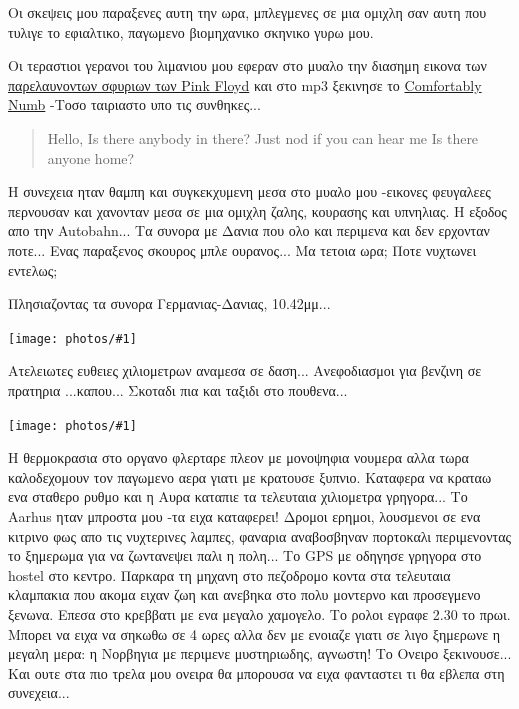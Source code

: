 \documentclass[11pt, letterpaper]{book}
\newcommand\photo[1]{\begin{center}\noindent\texttt{[image: photos/\#1]}\end{center}}
\begin{document}
Οι σκεψεις μου παραξενες αυτη την ωρα, μπλεγμενες σε μια ομιχλη σαν αυτη που τυλιγε το εφιαλτικο, παγωμενο βιομηχανικο σκηνικο γυρω μου.

Οι τεραστιοι γερανοι του λιμανιου μου εφεραν στο μυαλο την διασημη εικονα των \href{http://upload.wikimedia.org/wikipedia/en/0/03/Pinkfloydhammers.jpg}{παρελαυνοντων σφυριων των Pink Floyd} και στο mp3 ξεκινησε το \href{http://www.youtube.com/watch?v=jySUpMqmzd4}{Comfortably Numb} -Tοσο ταιριαστο υπο τις συνθηκες...

\begin{verse}
Hello,
Is there anybody in there?
Just nod if you can hear me
Is there anyone home?
\end{verse}

Η συνεχεια ηταν θαμπη και συγκεκχυμενη μεσα στο μυαλο μου -εικονες φευγαλεες περνουσαν και χανονταν μεσα σε μια ομιχλη ζαλης, κουρασης και υπνηλιας. Η εξοδος απο την Autobahn... Τα συνορα με Δανια που ολο και περιμενα και δεν ερχονταν ποτε... Ενας παραξενος σκουρος μπλε ουρανος... Μα τετοια ωρα; Ποτε νυχτωνει εντελως; 

Πλησιαζοντας τα συνορα Γερμανιας-Δανιας, 10.42μμ...

\photo{134.jpg}

Ατελειωτες ευθειες χιλιομετρων αναμεσα σε δαση... Ανεφοδιασμοι για βενζινη σε πρατηρια ...καπου... Σκοταδι πια και ταξιδι στο πουθενα...

\photo{135.jpg}

Η θερμοκρασια στο οργανο φλερταρε πλεον με μονοψηφια νουμερα αλλα τωρα καλοδεχομουν τον παγωμενο αερα γιατι με κρατουσε ξυπνιο. Καταφερα να κραταω ενα σταθερο ρυθμο και η Αυρα καταπιε τα τελευταια χιλιομετρα γρηγορα... 
Το Aarhus ηταν μπροστα μου -τα ειχα καταφερει! Δρομοι ερημοι, λουσμενοι σε ενα κιτρινο φως απο τις νυχτερινες λαμπες, φαναρια αναβοσβηναν πορτοκαλι περιμενοντας το ξημερωμα για να ζωντανεψει παλι η πολη... 
Το GPS με οδηγησε γρηγορα στο hostel στο κεντρο. 
Παρκαρα τη μηχανη στο πεζοδρομο κοντα στα τελευταια κλαμπακια που ακομα ειχαν ζωη και ανεβηκα στο πολυ μοντερνο και προσεγμενο ξενωνα. 
Επεσα στο κρεββατι με ενα μεγαλο χαμογελο. Το ρολοι εγραφε 2.30 το πρωι. 
Μπορει να ειχα να σηκωθω σε 4 ωρες αλλα δεν με ενοιαζε γιατι σε λιγο ξημερωνε η μεγαλη μερα: η Νορβηγια με περιμενε μυστηριωδης, αγνωστη! 
Το Ονειρο ξεκινουσε... Και ουτε στα πιο τρελα μου ονειρα θα μπορουσα να ειχα φανταστει τι θα εβλεπα στη συνεχεια... 
\end{document}
